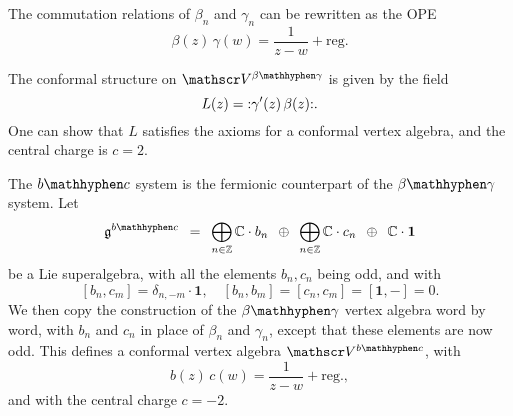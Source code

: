 \begin{example} 
    The commutation relations of $\beta_n$ and $\gamma_n$
    can be rewritten as the OPE
    \[
        \beta(z) \, \gamma(w) = \frac{1}{z - w} + \text{reg.}
    \]
    
    The conformal structure on $\scrV^\betagamma$ is given by the field
    \[
        L (z) = \mathopen{:} \gamma'(z) \, \beta(z) \mathclose{:}.
    \]
    One can show that $L$ satisfies the axioms for a conformal vertex algebra,
    and the central charge is $c = 2$. \varqed
\end{example}


\begin{example} [$\bc$ system]
    \label{eg-bc}
    The $\bc$ system is the fermionic counterpart of the $\betagamma$ system.
    Let
    \[
        \frg^\bc \enspace = \enspace 
        \bigoplus_{n \in \bbZ} \bbC \cdot b_n
        \enspace \oplus \enspace \bigoplus_{n \in \bbZ} \bbC \cdot c_n
        \enspace \oplus \enspace \bbC \cdot \mathbf{1}
    \]
    be a Lie superalgebra,
    with all the elements $b_n, c_n$ being odd, and with
    \[
        [b_n, c_m] = \delta_{n, -m} \cdot \mathbf{1}, \quad
        [b_n, b_m] = [c_n, c_m] = [\mathbf{1}, -] = 0.
    \]
    We then copy the construction of the $\betagamma$ vertex algebra
    word by word, with $b_n$ and $c_n$ in place of $\beta_n$ and $\gamma_n$,
    except that these elements are now odd.
    This defines a conformal vertex algebra
    $\scrV^\bc$, with
    \[
        b(z) \, c(w) = \frac{1}{z - w} + \text{reg.},
    \]
    and with the central charge $c = -2$. \varqed
\end{example}


